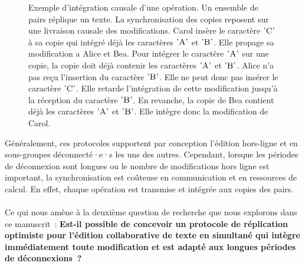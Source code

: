 \begin{figure}[bth]
\begin{subfigure}{.5\linewidth}
\begin{tikzpicture}
    \end{tikzpicture}
    \caption{}\label{fig:op-integration-order-example-2}
\end{subfigure}
\caption[Intégration causale d'une opération]{Exemple d'intégration causale d'une opération.
Un ensemble de pairs réplique un texte.
La synchronisation des copies reposent sur une livraison causale des modifications.
 Carol insère le caractère $\textsc{'C'}$ à sa copie qui intégré déjà les caractères $\textsc{'A'}$ et $\textsc{'B'}$.
Elle propage sa modification a Alice et Bea.
Pour intégrer le caractère $\textsc{'A'}$ sur une copie, la copie doit déjà contenir les caractères $\textsc{'A'}$ et $\textsc{'B'}$.
Alice n'a pas reçu l'insertion du caractère $\textsc{'B'}$.
Elle ne peut donc pas insérer le caractère $\textsc{'C'}$.
Elle retarde l'intégration de cette modification jusqu'à la réception du caractère $\textsc{'B'}$.
En revanche, la copie de Bea contient déjà les caractères $\textsc{'A'}$ et $\textsc{'B'}$.
 Elle intègre donc la modification de Carol.
}\label{fig:op-integration-order-example}
\end{figure}

Généralement, ces protocoles supportent par conception l'édition hors-ligne et en sous-groupes déconnecté·e·s les uns des autres.
Cependant, lorsque les périodes de déconnexion sont longues ou le nombre de modifications hors ligne est important, la synchronisation est coûteuse en communication et en ressources de calcul.
En effet, chaque opération est transmise et intégrée aux copies des pairs.

\paragraph{}Ce qui nous amène à la deuxième question de recherche que nous explorons dans ce manuscrit~: \textbf{Est-il possible de concevoir un protocole de réplication optimiste pour l'édition collaborative de texte en simultané qui intègre immédiatement toute modification et est adapté aux longues périodes de déconnexions~?}

